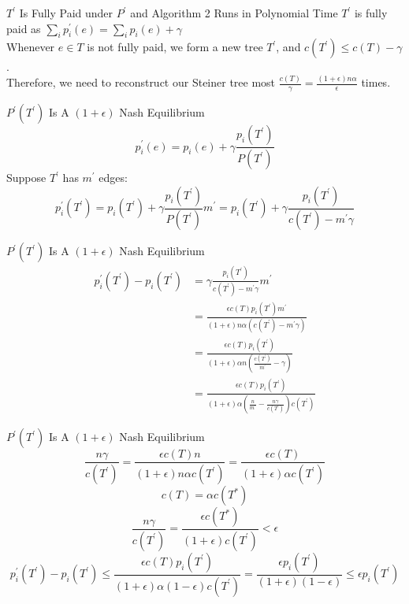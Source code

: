 \documentclass[11pt,aspectratio=169]{beamer}
\begin{document}
\begin{frame}{$T^{'}$ Is Fully Paid under $P^{'}$ and Algorithm 2 Runs in Polynomial Time}
    $T^{'}$ is fully paid as $\sum_i p_i^{'}(e) = \sum_i p_i(e) + \gamma$\\
    \vspace{15pt}
    Whenever \( e \in T \) is not fully paid, we form a new tree $T^{'}$, and $c(T^{'}) \leq c(T) - \gamma $.\\
    Therefore, we need to reconstruct our Steiner tree most  $\frac{c(T)}{\gamma} = \frac{(1+\epsilon)n\alpha }{\epsilon}$ times.

\end{frame}

\begin{frame}{$P^{'}(T^{'})$ Is A $(1+\epsilon)$ Nash Equilibrium}
    \[p_i^{'}(e) = p_i(e) + \gamma\frac{p_i(T^{'})}{P(T^{'})}\]
    \vspace{10pt}
    Suppose $T^{'}$ has $m^{'}$ edges:
    \[p_i^{'}(T^{'}) = p_i(T^{'}) + \gamma\frac{p_i(T^{'})}{P(T^{'})}m^{'} = p_i(T^{'}) + \gamma\frac{p_i(T^{'})}{c(T^{'}) - m^{'}\gamma}\]
    
\end{frame}

\begin{frame}{$P^{'}(T^{'})$ Is A $(1+\epsilon)$ Nash Equilibrium}
    \begin{align*}
    p_i^{'}(T^{'}) - p_i(T^{'}) &=  \gamma\frac{p_i(T^{'})}{c(T^{'}) - m^{'}\gamma}m^{'}\\  &= \frac{\epsilon c(T) p_i(T^{'}) m^{'} }{(1+\epsilon)n\alpha(c(T^{'}) - m^{'}\gamma)}  \\ &=  \frac{\epsilon c(T) p_i(T^{'})}{(1+\epsilon)\alpha n(\frac{c(T^{'})}{m^{'}} - \gamma)} \\ &=  \frac{\epsilon c(T) p_i(T^{'})}{(1+\epsilon)\alpha (\frac{n}{m^{'}} - \frac{n\gamma}{c(T^{'})})c(T^{'})}   
    \end{align*}
\end{frame}

\begin{frame}{$P^{'}(T^{'})$ Is A $(1+\epsilon)$ Nash Equilibrium}
    \[\frac{n\gamma}{c(T^{'})} = \frac{\epsilon c(T) n}{(1+\epsilon)n\alpha c(T^{'})} = \frac{\epsilon c(T) }{(1+\epsilon)\alpha c(T^{'})}\]
    \[c(T) = \alpha c(T^*)\]
    \[\frac{n\gamma}{c(T^{'})} = \frac{\epsilon c(T^*)}{(1+\epsilon)c(T^{'})} < \epsilon\]
    \[p_i^{'}(T^{'}) - p_i(T^{'}) \leq \frac{\epsilon c(T) p_i(T^{'}) }{(1+\epsilon)\alpha (1-\epsilon) c(T^{'}) } = \frac{\epsilon  p_i(T^{'}) }{(1+\epsilon) (1-\epsilon) } \leq \epsilon p_i(T^{'})\]
\end{frame}
\end{document}
